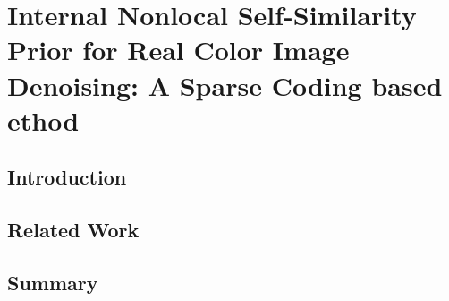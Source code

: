 %
\chapter{Internal Nonlocal Self-Similarity Prior for Real Color Image Denoising: A Sparse Coding based ethod}
\label{sec:real}


\blindtext

\section{Introduction}
\label{sec:real:intro}

\blindtext

\section{Related Work}
\label{sec:real:related}

\blindtext


\section{Summary}
\label{sec:real:summary}

\blindtext

